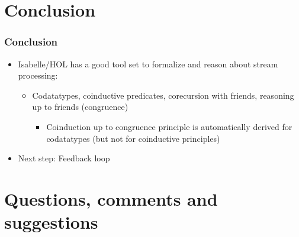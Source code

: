 \documentclass[aspectratio=169,10pt]{beamer}
\begin{document}
\section{Conclusion}

\begin{frame}
  \frametitle{Conclusion}
  \begin{itemize}
    \item Isabelle/HOL has a good tool set to formalize and reason about stream processing:
          \begin{itemize}
            \item Codatatypes, coinductive predicates, corecursion with friends, reasoning up to friends (congruence)
                  \begin{itemize}
                    \item Coinduction up to congruence principle is automatically derived for codatatypes (but not for coinductive principles)
                  \end{itemize}
          \end{itemize}
    \item Next step: Feedback loop
  \end{itemize}
\end{frame}

\section{Questions, comments and suggestions}
\end{document}
